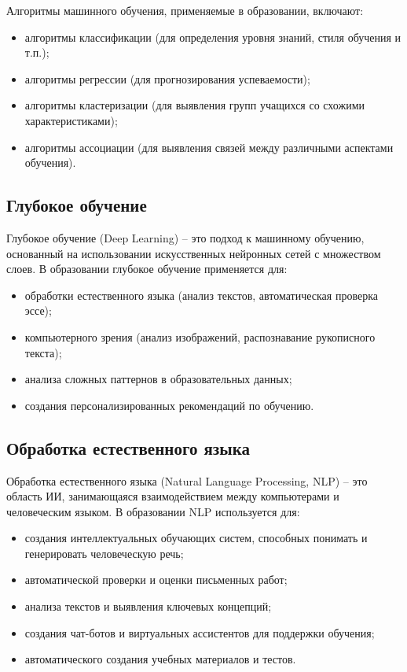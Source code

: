 \documentclass[a4paper,14pt]{extreport}
\begin{document}
Алгоритмы машинного обучения, применяемые в образовании, включают:
\begin{itemize}
    \item алгоритмы классификации (для определения уровня знаний, стиля обучения и т.п.);
    \item алгоритмы регрессии (для прогнозирования успеваемости);
    \item алгоритмы кластеризации (для выявления групп учащихся со схожими характеристиками);
    \item алгоритмы ассоциации (для выявления связей между различными аспектами обучения).
\end{itemize}

\subsection{Глубокое обучение}

Глубокое обучение (Deep Learning) – это подход к машинному обучению, основанный на использовании искусственных нейронных сетей с множеством слоев. В образовании глубокое обучение применяется для:

\begin{itemize}
    \item обработки естественного языка (анализ текстов, автоматическая проверка эссе);
    \item компьютерного зрения (анализ изображений, распознавание рукописного текста);
    \item анализа сложных паттернов в образовательных данных;
    \item создания персонализированных рекомендаций по обучению.
\end{itemize}
\subsection{Обработка естественного языка}

Обработка естественного языка (Natural Language Processing, NLP) – это область ИИ, занимающаяся взаимодействием между компьютерами и человеческим языком. В образовании NLP используется для:

\begin{itemize}
    \item создания интеллектуальных обучающих систем, способных понимать и генерировать человеческую речь;
    \item автоматической проверки и оценки письменных работ;
    \item анализа текстов и выявления ключевых концепций;
    \item создания чат-ботов и виртуальных ассистентов для поддержки обучения;
    \item автоматического создания учебных материалов и тестов.
\end{itemize}
\end{document}
